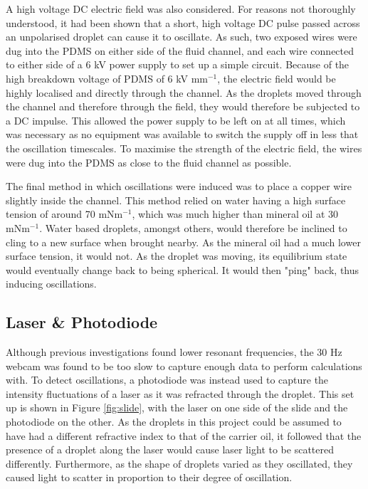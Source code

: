 \documentclass{physics_article_B}
\begin{document}
        A high voltage DC electric field was also considered. For reasons not thoroughly understood, it had been shown that a short, high voltage DC pulse passed across an unpolarised droplet can cause it to oscillate\cite{DCfield}. As such, two exposed wires were dug into the PDMS on either side of the fluid channel, and each wire connected to either side of a 6 kV power supply to set up a simple circuit. Because of the high breakdown voltage of PDMS\cite{PDMSBreakdown} of 6 kV mm$^{-1}$, the electric field would be highly localised and directly through the channel. As the droplets moved through the channel and therefore through the field, they would therefore be subjected to a DC impulse. This allowed the power supply to be left on at all times, which was necessary as no equipment was available to switch the supply off in less that the oscillation timescales. To maximise the strength of the electric field, the wires were dug into the PDMS as close to the fluid channel as possible.
        
        The final method in which oscillations were induced was to place a copper wire slightly inside the channel. This method relied on water having a high surface tension of around 70 mNm$^{-1}$, which was much higher than mineral oil at 30 mNm$^{-1}$. Water based droplets, amongst others, would therefore be inclined to cling to a new surface when brought nearby. As the mineral oil had a much lower surface tension, it would not. As the droplet was moving, its equilibrium state would eventually change back to being spherical. It would then "ping" back, thus inducing oscillations. 
        
    \subsection{Laser \& Photodiode\label{sect:method:laser}}
    
        Although previous investigations found lower resonant frequencies\cite{Temperton2012}, the 30 Hz webcam was found to be too slow to capture enough data to perform calculations with. To detect oscillations, a photodiode was instead used to capture the intensity fluctuations of a laser as it was refracted through the droplet. This set up is shown in Figure \ref{fig:slide}, with the laser on one side of the slide and the photodiode on the other. As the droplets in this project could be assumed to have had a different refractive index to that of the carrier oil\cite{viscosity1,viscosity2}, it followed that the presence of a droplet along the laser would cause laser light to be scattered differently. Furthermore, as the shape of droplets varied as they oscillated, they caused light to scatter in proportion to their degree of oscillation. 
        
\end{document}
